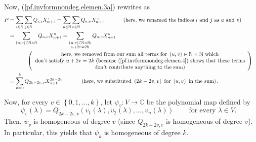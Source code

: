 \documentclass
[numbers=enddot,12pt,final,onecolumn,german,notitlepage]{scrartcl}%
\theoremstyle{definition}
\begin{document}
Now, (\ref{pf.invformnondeg.elemen.3a}) rewrites as%
\begin{align*}
P  &  =\sum\limits_{i\in\mathbb{N}}\sum\limits_{j\in\mathbb{N}}Q_{i,j}%
X_{n+1}^{i}=\sum\limits_{u\in\mathbb{N}}\sum\limits_{v\in\mathbb{N}}%
Q_{u,v}X_{n+1}^{u}\ \ \ \ \ \ \ \ \ \ \left(  \text{here, we renamed the
indices }i\text{ and }j\text{ as }u\text{ and }v\right) \\
&  =\sum\limits_{\left(  u,v\right)  \in\mathbb{N}\times\mathbb{N}}%
Q_{u,v}X_{n+1}^{u}=\sum\limits_{\substack{\left(  u,v\right)  \in
\mathbb{N}\times\mathbb{N};\\u+2v=2k}}Q_{u,v}X_{n+1}^{u}\\
&  \ \ \ \ \ \ \ \ \ \ \left(
\begin{array}
[c]{c}%
\text{here, we removed from our sum all terms for }\left(  u,v\right)
\in\mathbb{N}\times\mathbb{N}\text{ which}\\
\text{don't satisfy }u+2v=2k\text{ (because (\ref{pf.invformnondeg.elemen.4})
shows that these terms}\\
\text{don't contribute anything to the sum)}%
\end{array}
\right) \\
&  =\sum\limits_{v=0}^{k}Q_{2k-2v,v}X_{n+1}^{2k-2v}\ \ \ \ \ \ \ \ \ \ \left(
\text{here, we substituted }\left(  2k-2v,v\right)  \text{ for }\left(
u,v\right)  \text{ in the sum}\right)  .
\end{align*}


Now, for every $v\in\left\{  0,1,...,k\right\}  $, let $\psi_{v}%
:V\rightarrow\mathbb{C}$ be the polynomial map defined by%
\[
\psi_{v}\left(  \lambda\right)  =Q_{2k-2v,v}\left(  v_{1}\left(
\lambda\right)  ,v_{2}\left(  \lambda\right)  ,...,v_{n}\left(  \lambda
\right)  \right)  \ \ \ \ \ \ \ \ \ \ \text{for every }\lambda\in V.
\]
Then, $\psi_{v}$ is homogeneous of degree $v$ (since $Q_{2k-2v,v}$ is
homogeneous of degree $v$). In particular, this yields that $\psi_{k}$ is
homogeneous of degree $k$.
\end{document}
